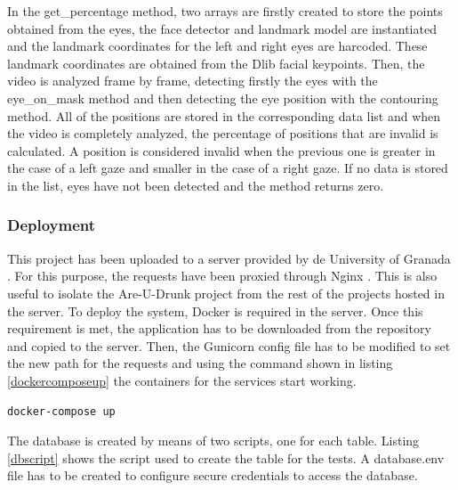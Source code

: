 In the get\_percentage method, two arrays are firstly created to store the points obtained from the eyes, the face detector and landmark model are instantiated and the landmark coordinates for the left and right eyes are harcoded. These landmark coordinates are obtained from the Dlib facial keypoints. Then, the video is analyzed frame by frame, detecting firstly the eyes with the eye\_on\_mask method and then detecting the eye position with the contouring method. All of the positions are stored in the corresponding data list and when the video is completely analyzed, the percentage of positions that are invalid is calculated. A position is considered invalid when the previous one is greater in the case of a left gaze and smaller in the case of a right gaze. If no data is stored in the list, eyes have not been detected and the method returns zero.

\subsubsection{Deployment}

This project has been uploaded to a server provided by de University of Granada \cite{ugr}. For this purpose, the requests have been proxied through Nginx \cite{nginx}. This is also useful to isolate the Are-U-Drunk project from the rest of the projects hosted in the server. To deploy the system, Docker is required in the server. Once this requirement is met, the application has to be downloaded from the repository and copied to the server. Then, the Gunicorn config file has to be modified to set the new path for the requests and using the command shown in listing \ref{dockercomposeup} the containers for the services start working.

\begin{lstlisting}[label={dockercomposeup}, caption={Command to start the containers}, captionpos=b]
docker-compose up
\end{lstlisting}

The database is created by means of two scripts, one for each table. Listing \ref{dbscript} shows the script used to create the table for the tests. A database.env file has to be created to configure secure credentials to access the database.

